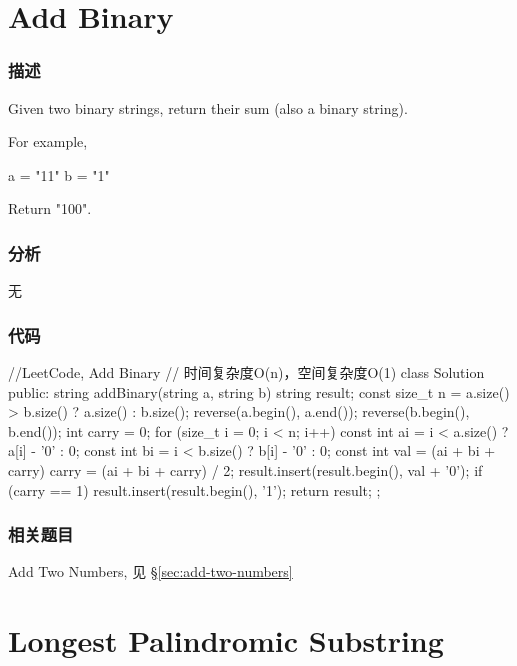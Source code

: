 \section{Add Binary} %
\label{sec:add-binary}


\subsubsection{描述}
Given two binary strings, return their sum (also a binary string).

For example,
\begin{Code}
a = "11"
b = "1"
\end{Code}
Return {\small {} "100"}.


\subsubsection{分析}
无


\subsubsection{代码}
\begin{Code}
//LeetCode, Add Binary
// 时间复杂度O(n)，空间复杂度O(1)
class Solution {
public:
    string addBinary(string a, string b) {
        string result;
        const size_t n = a.size() > b.size() ? a.size() : b.size();
        reverse(a.begin(), a.end());
        reverse(b.begin(), b.end());
        int carry = 0;
        for (size_t i = 0; i < n; i++) {
            const int ai = i < a.size() ? a[i] - '0' : 0;
            const int bi = i < b.size() ? b[i] - '0' : 0;
            const int val = (ai + bi + carry) %
            carry = (ai + bi + carry) / 2;
            result.insert(result.begin(), val + '0');
        }
        if (carry == 1) {
            result.insert(result.begin(), '1');
        }
        return result;
    }
};
\end{Code}


\subsubsection{相关题目}
\begindot
\item Add Two Numbers, 见 \S \ref{sec:add-two-numbers}
\myenddot


\section{Longest Palindromic Substring} %
\label{sec:longest-palindromic-substring}


